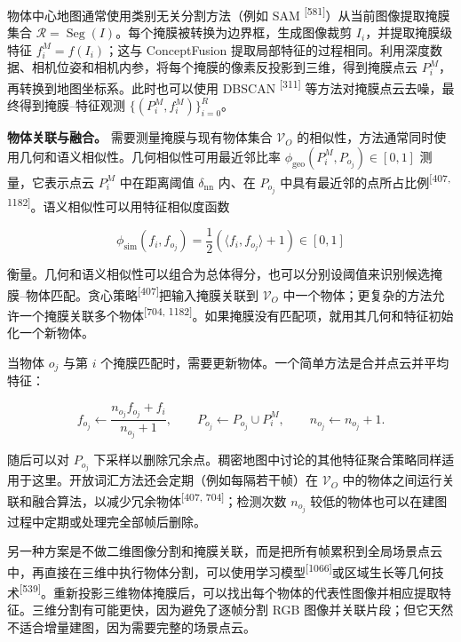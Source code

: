 物体中心地图通常使用类别无关分割方法（例如 SAM \textsuperscript{[581]}）从当前图像提取掩膜集合 $\mathcal{R}=\operatorname{Seg}(I)$。每个掩膜被转换为边界框，生成图像裁剪 $I_i$，并提取掩膜级特征 $f_i^M=f(I_i)$；这与 ConceptFusion 提取局部特征的过程相同。利用深度数据、相机位姿和相机内参，将每个掩膜的像素反投影到三维，得到掩膜点云 $P_i^M$，再转换到地图坐标系。此时也可以使用 DBSCAN \textsuperscript{[311]} 等方法对掩膜点云去噪，最终得到掩膜--特征观测 $\{(P_i^M,f_i^M)\}_{i=0}^{R}$。

\textbf{物体关联与融合。} 需要测量掩膜与现有物体集合 $\mathcal{V}_O$ 的相似性，方法通常同时使用几何和语义相似性。几何相似性可用最近邻比率 $\phi_{\mathrm{geo}}(P_i^M,P_{o_j})\in[0,1]$ 测量，它表示点云 $P_i^M$ 中在距离阈值 $\delta_{\mathrm{nn}}$ 内、在 $P_{o_j}$ 中具有最近邻的点所占比例\textsuperscript{[407, 1182]}。语义相似性可以用特征相似度函数

\begin{equation*}
\phi_{\mathrm{sim}}(f_i,f_{o_j})=\frac{1}{2}(\langle f_i,f_{o_j}\rangle+1)\in[0,1]
\end{equation*}

衡量。几何和语义相似性可以组合为总体得分，也可以分别设阈值来识别候选掩膜--物体匹配。贪心策略\textsuperscript{[407]}把输入掩膜关联到 $\mathcal{V}_O$ 中一个物体；更复杂的方法允许一个掩膜关联多个物体\textsuperscript{[704, 1182]}。如果掩膜没有匹配项，就用其几何和特征初始化一个新物体。

当物体 $o_j$ 与第 $i$ 个掩膜匹配时，需要更新物体。一个简单方法是合并点云并平均特征：

\begin{equation*}
f_{o_j}\leftarrow\frac{n_{o_j}f_{o_j}+f_i}{n_{o_j}+1},
\qquad P_{o_j}\leftarrow P_{o_j}\cup P_i^M,
\qquad n_{o_j}\leftarrow n_{o_j}+1.
\end{equation*}

随后可以对 $P_{o_j}$ 下采样以删除冗余点。稠密地图中讨论的其他特征聚合策略同样适用于这里。开放词汇方法还会定期（例如每隔若干帧）在 $\mathcal{V}_O$ 中的物体之间运行关联和融合算法，以减少冗余物体\textsuperscript{[407, 704]}；检测次数 $n_{o_j}$ 较低的物体也可以在建图过程中定期或处理完全部帧后删除。

另一种方案是不做二维图像分割和掩膜关联，而是把所有帧累积到全局场景点云中，再直接在三维中执行物体分割，可以使用学习模型\textsuperscript{[1066]}或区域生长等几何技术\textsuperscript{[539]}。重新投影三维物体掩膜后，可以找出每个物体的代表性图像并相应提取特征。三维分割有可能更快，因为避免了逐帧分割 RGB 图像并关联片段；但它天然不适合增量建图，因为需要完整的场景点云。

